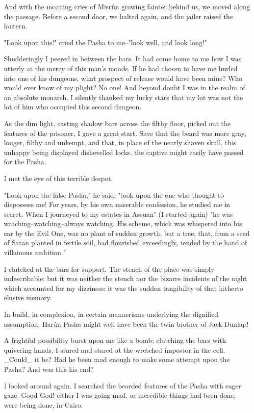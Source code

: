 And with the moaning cries of Misrûn growing fainter behind us, we
moved along the passage. Before a second door, we halted again, and
the jailer raised the lantern.

"Look upon this!" cried the Pasha to me--"look well, and look long!"

Shudderingly I peered in between the bars. It had come home to me how
I was utterly at the mercy of this man's moods. If he had chosen to
have me hurled into one of his dungeons, what prospect of release
would have been mine? Who would ever know of my plight? No one! And
beyond doubt I was in the realm of an absolute monarch. I silently
thanked my lucky stars that my lot was not the lot of him who occupied
this second dungeon.

As the dim light, casting shadow bars across the filthy floor, picked
out the features of the prisoner, I gave a great start. Save that the
beard was more gray, longer, filthy and unkempt, and that, in place
of the nearly shaven skull, this unhappy being displayed dishevelled
locks, the captive might easily have passed for the Pasha.

I met the eye of this terrible despot.

"Look upon the false Pasha," he said; "look upon the one who thought
to dispossess me! For years, by his own miserable confession, he
studied me in secret. When I journeyed to my estates in Assuan" (I
started again) "he was watching--watching--always watching. His
scheme, which was whispered into his ear by the Evil One, was no plant
of sudden growth, but a tree, that, from a seed of Satan planted in
fertile soil, had flourished exceedingly, tended by the hand of
villainous ambition."

I clutched at the bars for support. The stench of the place was simply
indescribable; but it was neither the stench nor the bizarre incidents
of the night which accounted for my dizziness: it was the sudden
tangibility of that hitherto elusive memory.

In build, in complexion, in certain mannerisms underlying the
dignified assumption, Harûn Pasha might well have been the twin
brother of Jack Dunlap!

A frightful possibility burst upon me like a bomb; clutching the bars
with quivering hands, I stared and stared at the wretched impostor in
the cell. _Could_ it be? Had he been mad enough to make some attempt
upon the Pasha? And was this his end?

I looked around again. I searched the bearded features of the Pasha
with eager gaze. Good God! either I was going mad, or incredible
things had been done, were being done, in Cairo.


